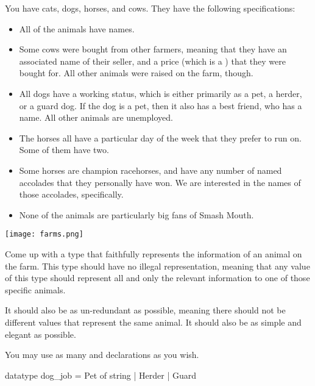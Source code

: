 \documentclass[addpoints,12pt, answers]{exam}
\begin{document}
\begin{questions}
You have cats, dogs, horses, and cows. They have the following specifications:
\begin{itemize}
  \item All of the animals have names.
  \item Some cows were bought from other farmers, meaning that they
  have an associated name of their seller, and a price (which is a )
  that they were bought for. All other animals were raised on the farm, though.
  \item All dogs have a working status, which is either primarily as a pet,
  a herder, or a guard dog. If the dog is a pet, then it also has a best friend,
  who has a name. All other animals are unemployed.
  \item The horses all have a particular day of the week that they prefer to
  run on. Some of them have two.
  \item Some horses are champion racehorses, and have any number of named accolades
  that they personally have won. We are interested in the names of those accolades,
  specifically.
  \item None of the animals are particularly big fans of Smash Mouth.
\end{itemize}

\vspace{20pt}

\begin{center}
\texttt{[image: farms.png]}
\end{center}

\newpage

\begin{parts}
  \bonuspart[5]\hfill

    Come up with a type  that faithfully represents the information
    of an animal on the farm. This type should have no illegal representation,
    meaning that any value of this type should represent all and only
    the relevant information to one of those specific animals.

    It should also be as un-redundant as possible, meaning there should not be
    different values that represent the same animal. It should also be as
    simple and elegant as possible.

    You may use as many  and  declarations as you wish.

    \begin{solutionorbox}[35em]
      \begin{codeblock}
        datatype dog_job = Pet of string | Herder | Guard


\end{codeblock}
\end{solutionorbox}
\end{parts}
\end{questions}
\end{document}
